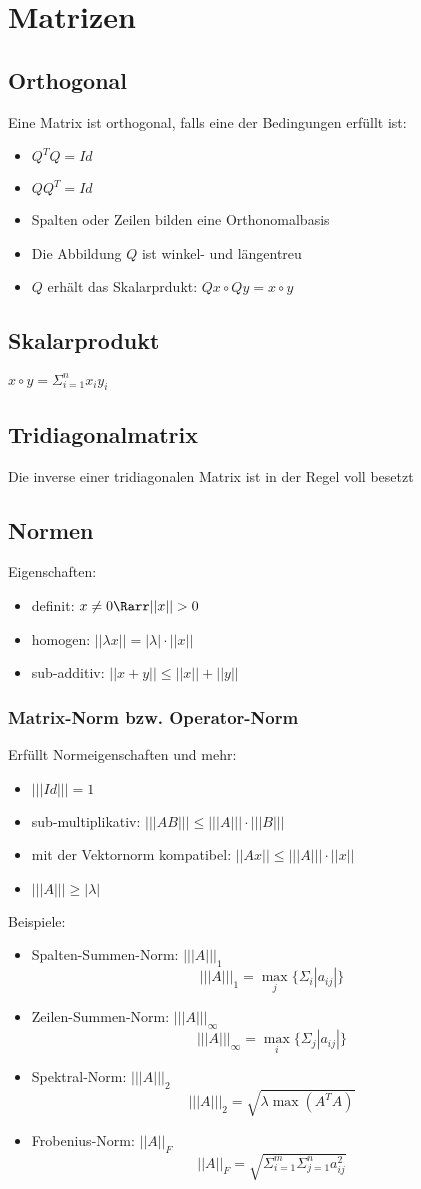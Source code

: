 \section{Matrizen}
\subsection{Orthogonal}
Eine Matrix ist orthogonal, falls eine der Bedingungen erfüllt ist:
\begin{itemize}
	\item $Q^TQ=Id$
	\item $QQ^T=Id$
	\item Spalten oder Zeilen bilden eine Orthonomalbasis
	\item Die Abbildung $Q$ ist winkel- und längentreu
	\item $Q$ erhält das Skalarprdukt: $Qx\circ Qy = x \circ y$
\end{itemize}
\subsection{Skalarprodukt}
$x\circ y=\displaystyle\Sigma_{i=1}^nx_iy_i$
\subsection{Tridiagonalmatrix}
Die inverse einer tridiagonalen Matrix ist in der Regel voll besetzt
\subsection{Normen}
Eigenschaften:
\begin{itemize}
	\item definit: $x\not= 0 \Rarr ||x|| > 0$
	\item homogen: $||\lambda x|| = |\lambda|\cdot||x||$
	\item sub-additiv: $||x+y|| \leq ||x|| + ||y||$
\end{itemize}
\subsubsection{Matrix-Norm bzw. Operator-Norm}
Erfüllt Normeigenschaften und mehr:
\begin{itemize}
	\item $|||Id|||=1$
	\item sub-multiplikativ: $|||AB|||\leq|||A|||\cdot|||B|||$
	\item mit der Vektornorm kompatibel: $||Ax|| \leq |||A|||\cdot||x||$ 
	\item $|||A|||\geq |\lambda|$
\end{itemize}
Beispiele:
\begin{itemize}
	\item Spalten-Summen-Norm: $|||A|||_1$
		$$
			|||A|||_1 = \max_j \{\Sigma_i|a_{ij}|\}
		$$
	\item Zeilen-Summen-Norm: $|||A|||_\infty$
		$$
			|||A|||_\infty = \max_i \{\Sigma_j|a_{ij}|\}
		$$
	\item Spektral-Norm: $|||A|||_2$
		$$
			|||A|||_2 = \sqrt{\lambda\max(A^TA)}
		$$
	\item Frobenius-Norm: $||A||_F$
		$$
			||A||_F = \sqrt{\Sigma_{i=1}^m\Sigma_{j=1}^na_{ij}^2}
		$$
\end{itemize}
